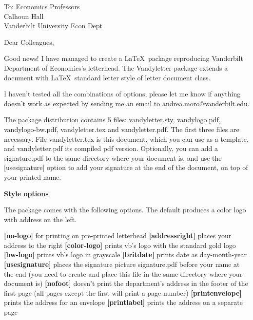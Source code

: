 \documentclass[color-logo]{letter}
\begin{document}
\begin{letter}{
To: Economics Professors\\
Calhoun Hall \\
Vanderbilt University Econ Dept}

\opening{
Dear Colleagues,
}


Good news! I have managed to create a \LaTeX\ package reproducing Vanderbilt
Department of Economics's letterhead.  The Vandyletter package extends a 
document with \LaTeX\ standard
letter style of letter document class.

I haven't tested all the combinations of options, please let me know if anything doesn't
work as expected by sending me an email to andrea.moro@vanderbilt.edu. 

The package distribution contains 5
files: vandyletter.sty, vandylogo.pdf, vandylogo-bw.pdf, vandyletter.tex and
vandyletter.pdf. The first three files are necessary. File vandyletter.tex
is this document, which you can use as a template, and vandyletter.pdf its
compiled pdf version. Optionally, you can add a signature.pdf
to the same directory where your document is, and use the [usesignature] option
to add your signature at the end of the document, on top of your printed name. 
 \bigskip

\textbf{Style options}

The package comes with the following options. The default produces a color logo with address on the left.

\textbf{[no-logo]} for printing on pre-printed letterhead\vspace{.8ex} \newline 
\textbf{[addressright]} places your address to the right\vspace{.8ex} \newline 
\textbf{[color-logo]} prints vb's logo with the standard gold logo \vspace{.8ex} \newline 
\textbf{[bw-logo]} prints vb's logo in grayscale\vspace{.8ex} \newline 
\textbf{[britdate]} prints date as day-month-year\vspace{.8ex} \newline 
\textbf{[usesignature]} places the signature picture signature.pdf before your name
at the end (you need to create and place this file in the same directory
where your document is)\vspace{.8ex} \newline 
\textbf{[nofoot]} doesn't print the department's address in the footer of the first
page (all pages except the first will print a page number) \vspace{.8ex} \newline 
\textbf{[printenvelope]}
prints the address for an envelope \vspace{.8ex} \newline 
\textbf{[printlabel]} prints the address on a separate page \vspace{.8ex} \newline 



\end{letter}
\end{document}
